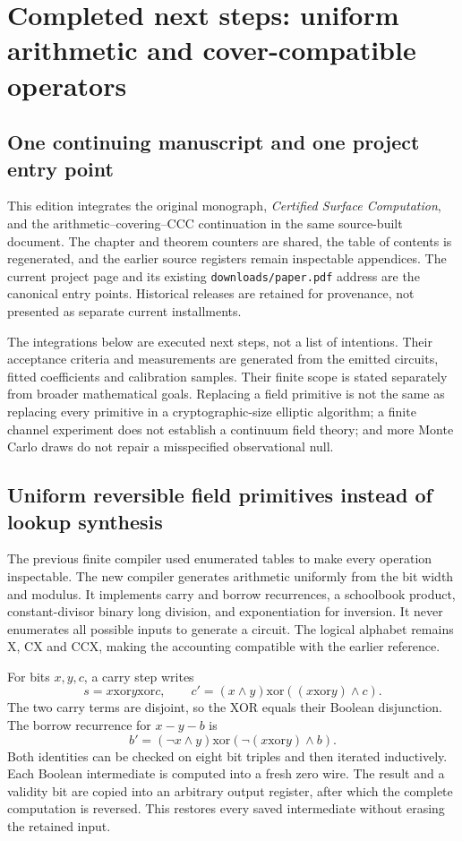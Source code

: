 \chapter{Completed next steps: uniform arithmetic and cover-compatible operators}
\label{ch:integrated-next-steps}

\section{One continuing manuscript and one project entry point}
This edition integrates the original monograph, \emph{Certified Surface Computation}, and the arithmetic--covering--CCC continuation in the same source-built document. The chapter and theorem counters are shared, the table of contents is regenerated, and the earlier source registers remain inspectable appendices. The current project page and its existing \texttt{downloads/paper.pdf} address are the canonical entry points. Historical releases are retained for provenance, not presented as separate current installments.

The integrations below are executed next steps, not a list of intentions. Their acceptance criteria and measurements are generated from the emitted circuits, fitted coefficients and calibration samples. Their finite scope is stated separately from broader mathematical goals. Replacing a field primitive is not the same as replacing every primitive in a cryptographic-size elliptic algorithm; a finite channel experiment does not establish a continuum field theory; and more Monte Carlo draws do not repair a misspecified observational null.

\section{Uniform reversible field primitives instead of lookup synthesis}
The previous finite compiler used enumerated tables to make every operation inspectable. The new compiler generates arithmetic uniformly from the bit width and modulus. It implements carry and borrow recurrences, a schoolbook product, constant-divisor binary long division, and exponentiation for inversion. It never enumerates all possible inputs to generate a circuit. The logical alphabet remains X, CX and CCX, making the accounting compatible with the earlier reference.

For bits $x,y,c$, a carry step writes
\[
 s=x\mathbin{\mathrm{xor}}y\mathbin{\mathrm{xor}}c,
 \qquad c'=(x\wedge y)\mathbin{\mathrm{xor}}
 ((x\mathbin{\mathrm{xor}}y)\wedge c).
\]
The two carry terms are disjoint, so the XOR equals their Boolean disjunction. The borrow recurrence for $x-y-b$ is
\[
 b'=(\neg x\wedge y)\mathbin{\mathrm{xor}}
 (\neg(x\mathbin{\mathrm{xor}}y)\wedge b).
\]
Both identities can be checked on eight bit triples and then iterated inductively. Each Boolean intermediate is computed into a fresh zero wire. The result and a validity bit are copied into an arbitrary output register, after which the complete computation is reversed. This restores every saved intermediate without erasing the retained input.

